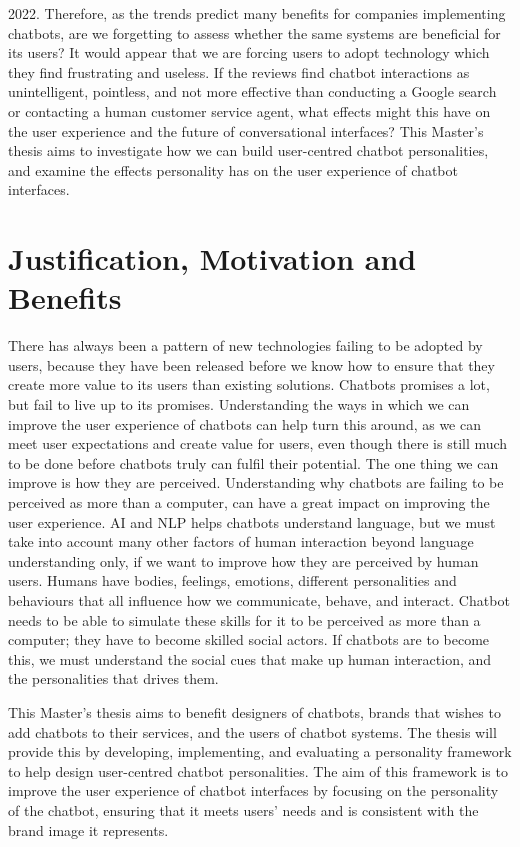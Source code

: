 2022. Therefore, as the trends predict many benefits for companies implementing chatbots, are we forgetting to assess whether the same systems are beneficial for its users? It would appear that we are forcing users to adopt technology which they find frustrating and useless. If the reviews find chatbot interactions as unintelligent, pointless, and not more effective than conducting a Google search or contacting a human customer service agent, what effects might this have on the user experience and the future of conversational interfaces?
This Master's thesis aims to investigate how we can build user-centred chatbot personalities, and examine the effects personality has on the user experience of chatbot interfaces. 

\vspace{5mm} %

\section{Justification, Motivation and Benefits}
There has always been a pattern of new technologies failing to be adopted by users, because they have been released before we know how to ensure that they create more value to its users than existing solutions. Chatbots promises a lot, but fail to live up to its promises. Understanding the ways in which we can improve the user experience of chatbots can help turn this around, as we can meet user expectations and create value for users, even though there is still much to be done before chatbots truly can fulfil their potential. The one thing we can improve is how they are perceived. Understanding why chatbots are failing to be perceived as more than a computer, can have a great impact on improving the user experience. AI and NLP helps chatbots understand language, but we must take into account many other factors of human interaction beyond language understanding only, if we want to improve how they are perceived by human users. Humans have bodies, feelings, emotions, different personalities and behaviours that all influence how we communicate, behave, and interact. Chatbot needs to be able to simulate these skills for it to be perceived as more than a computer; they have to become skilled social actors. If chatbots are to become this, we must understand the social cues that make up human interaction, and the personalities that drives them. 

This Master's thesis aims to benefit designers of chatbots, brands that wishes to add chatbots to their services, and the users of chatbot systems. The thesis will provide this by developing, implementing, and evaluating a personality framework to help design user-centred chatbot personalities. The aim of this framework is to improve the user experience of chatbot interfaces by focusing on the personality of the chatbot, ensuring that it meets users' needs and is consistent with the brand image it represents.



